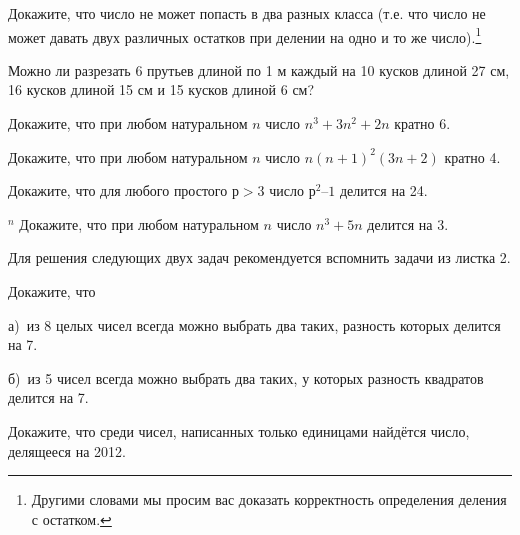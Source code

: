
\begin{thm}
    Докажите, что число не может попасть в два разных класса (т.е. что число не может давать двух различных остатков при делении на одно и то же число).\footnote{Другими словами мы просим вас доказать корректность определения деления с остатком.}
\end{thm}
    
\begin{thm}
    Можно ли разрезать 6 прутьев длиной по 1 м каждый на 10 кусков длиной 27 см, 16 кусков длиной 15 см и 15 кусков длиной 6 см?
\end{thm}

\begin{thm}
    Докажите, что при любом натуральном $n$ число $n^3 + 3n^2 + 2n$ кратно 6.
\end{thm}

\begin{thm}
    Докажите, что при любом натуральном $n$ число $n(n + 1)^2(3n + 2)$ кратно 4.
\end{thm}

\begin{thm}
    Докажите, что для любого простого $р > 3$ число $р^2 – 1$ делится на 24.
\end{thm}

\begin{thm} $^n$ \label{4.2 thm1}
         Докажите, что при любом натуральном $n$ число $n^3 + 5n$  делится на 3. 
\end{thm}  

\begin{center}
Для решения следующих двух задач рекомендуется вспомнить задачи из листка 2. 
\end{center}

\begin{thm} Докажите, что
    \par 
    а)~из 8 целых чисел всегда можно выбрать два таких, разность которых делится на 7. 
    \par 
    б)~из 5 чисел всегда можно выбрать два таких, у которых разность квадратов делится на 7.
\end{thm}

\begin{thm}
    Докажите, что среди чисел, написанных только единицами найдётся число,
    \\
    делящееся на 2012.
\end{thm}

